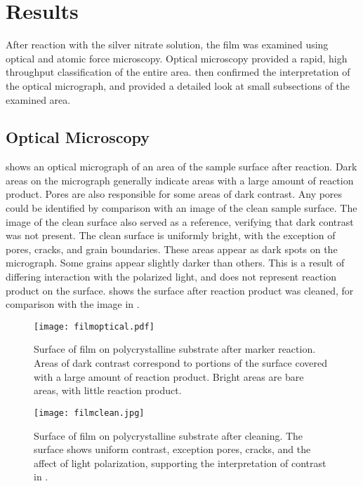 \section{Results}
\label{sec:poly.reac.results}

After reaction with the silver nitrate solution, the film was examined using optical and atomic force microscopy. Optical microscopy provided a rapid, high throughput classification of the entire area.  then confirmed the interpretation of the optical micrograph, and provided a detailed look at small subsections of the examined area.


\subsection{Optical Microscopy}
\label{subsec:poly.reac.optical}


 shows an optical micrograph of an area of the sample surface after reaction. Dark areas on the micrograph generally indicate areas with a large amount of reaction product. Pores are also responsible for some areas of dark contrast. Any pores could be identified by comparison with an image of the clean sample surface. The image of the clean surface also served as a reference, verifying that dark contrast was not present. The clean surface is uniformly bright, with the exception of pores, cracks, and grain boundaries. These areas appear as dark spots on the micrograph. Some grains appear slightly darker than others. This is a result of differing interaction with the polarized light, and does not represent reaction product on the surface.  shows the surface after reaction product was cleaned, for comparison with the image in .
\begin{figure}
	\texttt{[image: filmoptical.pdf]}
		\caption[Film surface after reaction]{%
			Surface of  film on polycrystalline
			 substrate after marker reaction. Areas
			of dark contrast correspond to portions of the surface
			covered with a large amount of reaction product.
			Bright areas are bare areas, with little reaction
			product.}
	\label{fig:filmoptical}
\end{figure}
%
%
\begin{figure}
\begin{center}
\texttt{[image: filmclean.jpg]}
\caption[Cleaned film surface]{%
	Surface of  film on polycrystalline  
	substrate after cleaning. The surface shows uniform contrast, exception pores, cracks, and the affect of light polarization,
	supporting the interpretation of contrast in .}
\label{fig:filmclean}
\end{center}
\end{figure}

